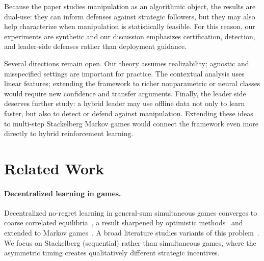 \documentclass{article}
\begin{document}
Because the paper studies manipulation as an algorithmic object, the results are dual-use: they can inform defenses against strategic followers, but they may also help characterize when manipulation is statistically feasible. For this reason, our experiments are synthetic and our discussion emphasizes certification, detection, and leader-side defenses rather than deployment guidance.

Several directions remain open. Our theory assumes realizability; agnostic and misspecified settings are important for practice. The contextual analysis uses linear features; extending the framework to richer nonparametric or neural classes would require new confidence and transfer arguments. Finally, the leader side deserves further study: a hybrid leader may use offline data not only to learn faster, but also to detect or defend against manipulation. Extending these ideas to multi-step Stackelberg Markov games would connect the framework even more directly to hybrid reinforcement learning.



\newpage
\appendix
\section{Related Work}\label{sec:related}

\paragraph{Decentralized learning in games.}
Decentralized no-regret learning in general-sum simultaneous games converges to coarse correlated equilibria~\cite{blum2007external}, a result sharpened by optimistic methods~\cite{daskalakis2021near, chen2020hedging, anagnostides2022near} and extended to Markov games~\cite{jin2021v, liu2021sharp}. A broad literature studies variants of this problem~\cite{wu2022multi, meng2021decentralized, wei2021last, song2021can, mao2023provably, zhong2023can, ghosh2023provably}. We focus on Stackelberg (sequential) rather than simultaneous games, where the asymmetric timing creates qualitatively different strategic incentives.
\end{document}
